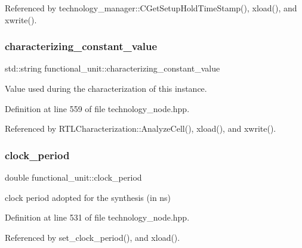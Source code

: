 Referenced by technology\+\_\+manager\+::\+C\+Get\+Setup\+Hold\+Time\+Stamp(), xload(), and xwrite().

\mbox{\label{structfunctional__unit_acc3396c5f54360855fce38a9139b13d7}} 
\subsubsection{\texorpdfstring{characterizing\+\_\+constant\+\_\+value}{characterizing\_constant\_value}}
{\footnotesize\ttfamily std\+::string functional\+\_\+unit\+::characterizing\+\_\+constant\+\_\+value}



Value used during the characterization of this instance. 



Definition at line 559 of file technology\+\_\+node.\+hpp.



Referenced by R\+T\+L\+Characterization\+::\+Analyze\+Cell(), xload(), and xwrite().

\mbox{\label{structfunctional__unit_a23b09a94ab9ead08b5d93a26abcf4af4}} 
\subsubsection{\texorpdfstring{clock\+\_\+period}{clock\_period}}
{\footnotesize\ttfamily double functional\+\_\+unit\+::clock\+\_\+period}



clock period adopted for the synthesis (in ns) 



Definition at line 531 of file technology\+\_\+node.\+hpp.



Referenced by set\+\_\+clock\+\_\+period(), and xload().

\mbox{\label{structfunctional__unit_ac14d8f1cd1dda0cfa4479ce413f5931b}} 
